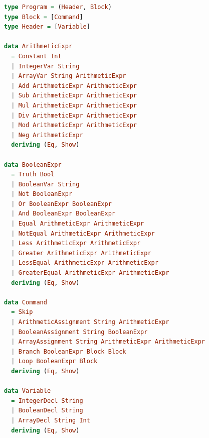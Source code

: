 \documentclass[12pt,a4paper]{article}
\begin{document}
\begin{lstlisting}[language=Haskell, style=custom-style]
type Program = (Header, Block)
type Block = [Command]
type Header = [Variable]

data ArithmeticExpr
  = Constant Int
  | IntegerVar String
  | ArrayVar String ArithmeticExpr
  | Add ArithmeticExpr ArithmeticExpr
  | Sub ArithmeticExpr ArithmeticExpr
  | Mul ArithmeticExpr ArithmeticExpr
  | Div ArithmeticExpr ArithmeticExpr
  | Mod ArithmeticExpr ArithmeticExpr
  | Neg ArithmeticExpr
  deriving (Eq, Show)

data BooleanExpr
  = Truth Bool
  | BooleanVar String
  | Not BooleanExpr
  | Or BooleanExpr BooleanExpr
  | And BooleanExpr BooleanExpr
  | Equal ArithmeticExpr ArithmeticExpr
  | NotEqual ArithmeticExpr ArithmeticExpr
  | Less ArithmeticExpr ArithmeticExpr
  | Greater ArithmeticExpr ArithmeticExpr
  | LessEqual ArithmeticExpr ArithmeticExpr
  | GreaterEqual ArithmeticExpr ArithmeticExpr
  deriving (Eq, Show)

data Command
  = Skip
  | ArithmeticAssignment String ArithmeticExpr
  | BooleanAssignment String BooleanExpr
  | ArrayAssignment String ArithmeticExpr ArithmeticExpr
  | Branch BooleanExpr Block Block
  | Loop BooleanExpr Block
  deriving (Eq, Show)

data Variable
  = IntegerDecl String
  | BooleanDecl String
  | ArrayDecl String Int
  deriving (Eq, Show)
\end{lstlisting}
\end{document}
